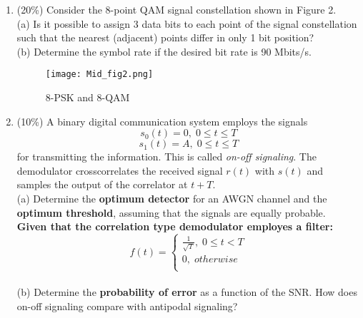 \documentclass[a4paper,12pt]{article}
\begin{document}
\begin{enumerate}
        \item (20\%) 
            Consider the 8-point QAM signal constellation shown in Figure 2. \\
            (a) Is it possible to assign 3 data bits to each point of the signal constellation such that the nearest (adjacent) points differ in only 1 bit position? \\ 
            (b) Determine the symbol rate if the desired bit rate is 90 Mbits/s. \\ 
            \begin{figure}[h]
            	\centering
            	\texttt{[image: Mid\_fig2.png]}
            	\caption{8-PSK and 8-QAM}
            \end{figure}
        \item (10\%) 
            A binary digital communication system employs the signals \\ 
            $$s_0(t) = 0, \; 0 \leq t \leq T$$
            $$s_1(t) = A, \; 0 \leq t \leq T$$
            for transmitting the information. This is called \emph{on-off signaling}. The demodulator crosscorrelates the received signal $r(t)$ with $s(t)$ and samples the output of the correlator at $t + T$. \\
            (a) Determine the \textbf{optimum detector} for an AWGN channel and the \textbf{optimum threshold}, assuming that the signals are equally probable. \\ 
            \textbf{Given that the correlation type demodulator employes a filter:} \\ 
            $$f(t) = \left\{ 
            \begin{aligned}
                \frac{1}{\sqrt{T}}, \; 0 \leq t < T \\
                 0, \; otherwise \\ 
            \end{aligned}
            \right.
            $$ \\
            (b) Determine the \textbf{probability of error} as a function of the SNR. How does on-off signaling compare with antipodal signaling? \\

\end{enumerate}
\end{document}
